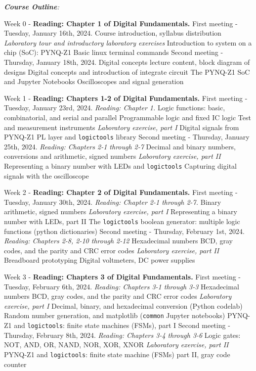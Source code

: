 \documentclass[10pt]{article}
\begin{document}
\textit{\textbf{Course Outline}:}
\begin{outline}[enumerate]

\1 Week 0 - \textbf{Reading: Chapter 1 of Digital Fundamentals.}
\2 First meeting - Tuesday, January 16th, 2024.
\3 Course introduction, syllabus distribution
\3 \textit{Laboratory tour and introductory laboratory exercises}
\4 Introduction to system on a chip (SoC): PYNQ-Z1
\4 Basic linux terminal commands
\2 Second meeting - Thursday, January 18th, 2024.
\3 Digital concepts lecture content, block diagram of designs
\3 Digital concepts and introduction of integrate circuit
\4 The PYNQ-Z1 SoC and Jupyter Notebooks
\4 Oscilloscopes and signal generation

\1 Week 1 - \textbf{Reading: Chapters 1-2 of Digital Fundamentals.}
\2 First meeting - Tuesday, January 23rd, 2024. \textit{Reading: Chapter 1.}
\3 Logic functions: basic, combinatorial, and serial and parallel
\3 Programmable logic and fixed IC logic
\3 Test and measurement instruments
\3 \textit{Laboratory exercise, part I}
\4 Digital signals from PYNQ-Z1
\4 PL layer and \verb+logictools+ library
\2 Second meeting - Thursday, January 25th, 2024. \textit{Reading: Chapters 2-1 through 2-7}
\3 Decimal and binary numbers, conversions and arithmetic, signed numbers
\3 \textit{Laboratory exercise, part II}
\4 Representing a binary number with LEDs and \verb+logictools+
\4 Capturing digital signals with the oscilloscope

\1 Week 2 - \textbf{Reading: Chapter 2 of Digital Fundamentals.}
\2 First meeting - Tuesday, January 30th, 2024. \textit{Reading: Chapter 2-1 through 2-7.}
\3 Binary arithmetic, signed numbers
\3 \textit{Laboratory exercise, part I}
\4 Representing a binary number with LEDs, part II
\4 The \verb+logictools+ boolean generator: multiple logic functions (python dictionaries)
\2 Second meeting - Thursday, February 1st, 2024. \textit{Reading: Chapters 2-8, 2-10 through 2-12}
\3 Hexadecimal numbers
\3 BCD, gray codes, and the parity and CRC error codes
\3 \textit{Laboratory exercise, part II}
\4 Breadboard prototyping
\4 Digital voltmeters, DC power supplies

\clearpage

\1 Week 3 - \textbf{Reading: Chapters 3 of Digital Fundamentals.}
\2 First meeting - Tuesday, February 6th, 2024.  \textit{Reading: Chapters 3-1 through 3-3}
\3 Hexadecimal numbers
\3 BCD, gray codes, and the parity and CRC error codes
\3 \textit{Laboratory exercise, part I}
\4 Decimal, binary, and hexadecimal conversion (Python codelab)
\4 Random number generation, and matplotlib (\verb+common+ Jupyter notebooks)
\4 PYNQ-Z1 and \verb+logictools+: finite state machines (FSMs), part I
\2 Second meeting - Thursday, February 8th, 2024. \textit{Reading: Chapters 3-4 through 3-6}
\3 Logic gates: NOT, AND, OR, NAND, NOR, XOR, XNOR
\3 \textit{Laboratory exercise, part II}
\4 PYNQ-Z1 and \verb+logictools+: finite state machine (FSMs) part II, gray code counter


\end{outline}
\end{document}
